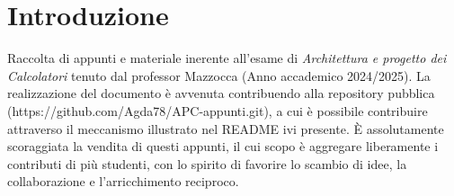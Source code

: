 \chapter*{Introduzione}

Raccolta di appunti e materiale inerente all'esame di \textit{Architettura e progetto dei Calcolatori} tenuto dal professor Mazzocca (Anno accademico 2024/2025). La realizzazione del documento è avvenuta contribuendo alla repository pubblica (https://github.com/Agda78/APC-appunti.git), a cui è possibile contribuire attraverso il meccanismo illustrato nel README ivi presente. 
\uppercase{è} assolutamente scoraggiata la vendita di questi appunti, il cui scopo è aggregare liberamente i contributi di più studenti, con lo spirito di favorire lo scambio di idee, la collaborazione e l'arricchimento reciproco. 
